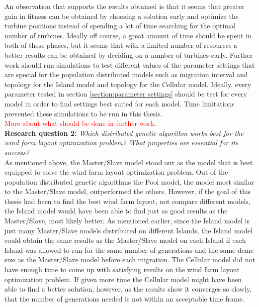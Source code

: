 \noindent An observation that supports the results obtained is that it seems that greater gain in fitness can be obtained by choosing a solution early and optimize the turbine positions instead of spending a lot of time searching for the optimal number of turbines. Ideally off course, a great amount of time should be spent in both of these phases, but it seems that with a limited number of resources a better results can be obtained by deciding on a number of turbines early. Further work should run simulations to test different values of the parameter settings that are special for the population distributed models such as migration interval and topology for the Island model and topology for the Cellular model. Ideally, every parameter tested in section \ref{section:parameter settings} should be test for every model in order to find settings best suited for each model. Time limitations prevented these simulations to be run in this thesis.\\ 


\noindent \textcolor{red}{More about what should be done in further work.}\\


\noindent \textbf{Research question 2: } \textit{Which distributed genetic algorithm works best for the wind farm layout optimization problem? What properties are essential for its success?}\\


\noindent As mentioned above, the Master/Slave model stood out as the model that is best equipped to solve the wind farm layout optimization problem. Out of the population distributed genetic algorithms the Pool model, the model most similar to the Master/Slave model, outperformed the others. However, if the goal of this thesis had been to find the best wind farm layout, not compare different models, the Island model would have been able to find just as good results as the Master/Slave, most likely better. As mentioned earlier, since the Island model is just many Master/Slave models distributed on different Islands, the Island model could obtain the same results as the Master/Slave model on each Island if each Island was allowed to run for the same number of generations and the same deme size as the Master/Slave model before each migration. The Cellular model did not have enough time to come up with satisfying results on the wind farm layout optimization problem. If given more time the Cellular model might have been able to find a better solution, however, as the results show it converges so slowly, that the number of generations needed is not within an acceptable time frame.\\


